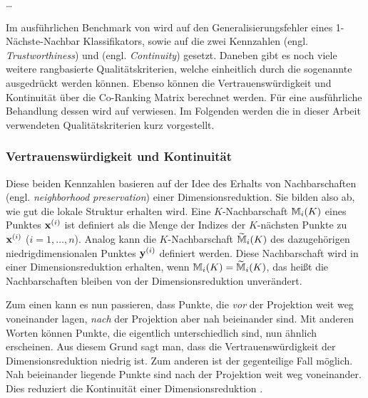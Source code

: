 \ldots
{}

Im ausführlichen Benchmark von \textcite{vanderMaaten.2009} wird auf den Generalisierungsfehler
eines 1-Nächste-Nachbar Klassifikators, sowie auf die zwei Kennzahlen
 (engl. \textit{Trustworthiness}) und  (engl.
\textit{Continuity}) \parencites{Venna.2001}{Venna.2006} gesetzt. Daneben gibt es noch viele weitere rangbasierte
Qualitätskriterien, welche einheitlich durch die sogenannte  ausgedrückt
werden können. Ebenso können die Vertrauenswürdigkeit und Kontinuität über die Co-Ranking Matrix
berechnet werden. Für eine ausführliche Behandlung dessen wird auf \textcite{Lee.2009} verwiesen.
Im Folgenden werden die in dieser Arbeit verwendeten Qualitätskriterien kurz vorgestellt.

\subsubsection{Vertrauenswürdigkeit und Kontinuität}
Diese beiden Kennzahlen basieren auf der Idee des Erhalts von Nachbarschaften (engl.
\textit{neighborhood preservation}) einer Dimensionsreduktion. Sie bilden also ab, wie gut die
lokale Struktur erhalten wird. Eine $K$-Nachbarschaft $\mathbb{M}_i(K)$ eines Punktes $\mathbf{x}^{(i)}$
ist definiert als die Menge der Indizes der $K$-nächsten
Punkte zu $\mathbf{x}^{(i)}$ ($i = 1, \ldots, n$). Analog kann die $K$-Nachbarschaft
$\widetilde{\mathbb{M}}_i(K)$ des dazugehörigen niedrigdimensionalen Punktes $\mathbf{y}^{(i)}$
definiert werden. Diese Nachbarschaft wird in einer Dimensionsreduktion erhalten, wenn
$\mathbb{M}_i(K) = \widetilde{\mathbb{M}}_i(K)$, das heißt die Nachbarschaften bleiben von der
Dimensionsreduktion unverändert.

Zum einen kann es nun passieren, dass Punkte, die \textit{vor} der Projektion weit weg voneinander
lagen, \textit{nach} der Projektion aber nah beieinander sind. Mit anderen Worten können Punkte,
die eigentlich unterschiedlich sind, nun ähnlich erscheinen. Aus diesem Grund sagt man, dass die
Vertrauenswürdigkeit der Dimensionsreduktion niedrig ist. Zum anderen ist der gegenteilige Fall
möglich. Nah beieinander liegende Punkte sind nach der Projektion weit weg voneinander. Dies
reduziert die Kontinuität einer Dimensionsreduktion \parencite[486 -- 487]{Venna.2001}.

